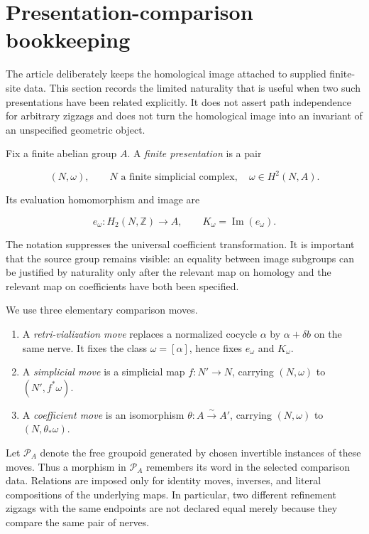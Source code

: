 \section{Presentation-comparison bookkeeping}
\label{sec:presentation-bookkeeping}

The article deliberately keeps the homological image attached to supplied
finite-site data.  This section records the limited naturality that is useful
when two such presentations have been related explicitly.  It does not assert
path independence for arbitrary zigzags and does not turn the homological
image into an invariant of an unspecified geometric object.

Fix a finite abelian group \(A\).  A \emph{finite presentation} is a pair

\[
 (N,\omega),
 \qquad N\text{ a finite simplicial complex},\quad
 \omega\in H^2(N,A).
\]

Its evaluation homomorphism and image are

\[
 e_\omega:H_2(N,\mathbb Z)\longrightarrow A,
 \qquad K_\omega=\operatorname{Im}(e_\omega).
\]

The notation suppresses the universal coefficient transformation.  It is
important that the source group remains visible: an equality between image
subgroups can be justified by naturality only after the relevant map on
homology and the relevant map on coefficients have both been specified.

We use three elementary comparison moves.

\begin{enumerate}[label=(\roman*),nosep]
\item A \emph{retri-vialization move} replaces a normalized cocycle
      \(\alpha\) by \(\alpha+\delta b\) on the same nerve.  It fixes the
      class \(\omega=[\alpha]\), hence fixes \(e_\omega\) and
      \(K_\omega\).
\item A \emph{simplicial move} is a simplicial map \(f:N'\to N\), carrying
      \((N,\omega)\) to \((N',f^*\omega)\).
\item A \emph{coefficient move} is an isomorphism
      \(\theta:A\xrightarrow{\sim}A'\), carrying \((N,\omega)\) to
      \((N,\theta_*\omega)\).
\end{enumerate}

Let \(\mathscr P_A\) denote the free groupoid generated by chosen invertible
instances of these moves.  Thus a morphism in \(\mathscr P_A\) remembers its
word in the selected comparison data.  Relations are imposed only for
identity moves, inverses, and literal compositions of the underlying maps.
In particular, two different refinement zigzags with the same endpoints are
not declared equal merely because they compare the same pair of nerves.

